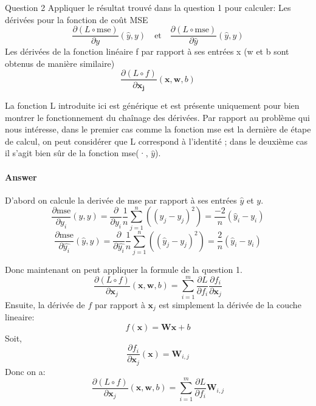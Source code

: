 \documentclass[12pt,a4paper]{article}
\begin{document}
\begin{section}{Question 2}
Appliquer le résultat trouvé dans la question 1 pour calculer: \newline
Les dérivées pour la fonction de coût MSE
\[
\frac{\partial (L\circ \text{mse})}{\partial y}(\hat{y}, y)
\quad \text{et} \quad
\frac{\partial (L\circ \text{mse})}{\partial \hat{y}}(\hat{y}, y)
\]
Les dérivées de la fonction linéaire f par rapport à ses entrées x (w et b sont
obtenus de manière similaire)
\[\frac{\partial (L\circ f)}{\partial \mathbf{x_j}}(\mathbf{x}, \mathbf{w}, b)\]

La fonction L introduite ici est générique et est présente uniquement pour bien montrer 
le fonctionnement du chaînage des dérivées. Par rapport au problème qui nous
intéresse, dans le premier cas comme la fonction mse est la dernière de étape de calcul, on peut considérer que L correspond à l'identité ; dans le deuxième cas il s'agit
bien sûr de la fonction mse(·, $\hat{y}$).

\paragraph{Answer}
D'abord on calcule la derivée de mse par rapport à ses entrées \(\hat{y}\) et \(y\).
\[
\frac{\partial \text{mse}}{\partial y_i}(\hat{y}, y) = \frac{\partial}{\partial y_i} \frac{1}{n} \sum_{j=1}^{n} \left( (\hat{y}_j - y_j)^2 \right) = \frac{-2}{n}(\hat{y}_i - y_i)
\]
\[
\frac{\partial \text{mse}}{\partial \hat{y_i}}(\hat{y}, y) = \frac{\partial}{\partial \hat{y_i}} \frac{1}{n} \sum_{j=1}^{n} \left( (\hat{y}_j - y_j)^2 \right) = \frac{2}{n}(\hat{y}_i - y_i)
\]

Donc maintenant on peut appliquer la formule de la question 1.
\[
\frac{\partial (L \circ f)}{\partial \mathbf{x}_j}(\mathbf{x}, \mathbf{w}, b) =
\sum_{i=1}^{m} \frac{\partial L}{\partial f_i}\frac{\partial f_i}{\partial \mathbf{x}_j}
\]
Ensuite, la dérivée de \(f\) par rapport à \(\mathbf{x}_j\) est simplement la dérivée de la couche lineaire:
\[
f(\mathbf{x}) = \mathbf{W}\mathbf{x} + b
\]
Soit,
\[
\frac{\partial f_i}{\partial \mathbf{x}_j}(\mathbf{x}) = \mathbf{W}_{i,j}
\]
Donc on a:
\[
\frac{\partial (L \circ f)}{\partial \mathbf{x}_j}(\mathbf{x}, \mathbf{w}, b) =
\sum_{i=1}^{m} \frac{\partial L}{\partial f_i} \mathbf{W}_{i,j} 
\]

\end{section}
\end{document}
